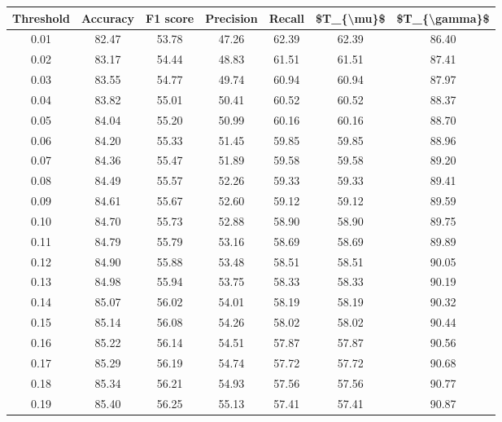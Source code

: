 \begin{tabular}{|c|c|c|c|c|c|c|}
\hline
 Threshold &  Accuracy &  F1 score &  Precision &  Recall &  \$T\_\{\textbackslash mu\}\$ &  \$T\_\{\textbackslash gamma\}\$ \\
\hline
      0.01 &     82.47 &     53.78 &      47.26 &   62.39 &      62.39 &         86.40 \\
      0.02 &     83.17 &     54.44 &      48.83 &   61.51 &      61.51 &         87.41 \\
      0.03 &     83.55 &     54.77 &      49.74 &   60.94 &      60.94 &         87.97 \\
      0.04 &     83.82 &     55.01 &      50.41 &   60.52 &      60.52 &         88.37 \\
      0.05 &     84.04 &     55.20 &      50.99 &   60.16 &      60.16 &         88.70 \\
      0.06 &     84.20 &     55.33 &      51.45 &   59.85 &      59.85 &         88.96 \\
      0.07 &     84.36 &     55.47 &      51.89 &   59.58 &      59.58 &         89.20 \\
      0.08 &     84.49 &     55.57 &      52.26 &   59.33 &      59.33 &         89.41 \\
      0.09 &     84.61 &     55.67 &      52.60 &   59.12 &      59.12 &         89.59 \\
      0.10 &     84.70 &     55.73 &      52.88 &   58.90 &      58.90 &         89.75 \\
      0.11 &     84.79 &     55.79 &      53.16 &   58.69 &      58.69 &         89.89 \\
      0.12 &     84.90 &     55.88 &      53.48 &   58.51 &      58.51 &         90.05 \\
      0.13 &     84.98 &     55.94 &      53.75 &   58.33 &      58.33 &         90.19 \\
      0.14 &     85.07 &     56.02 &      54.01 &   58.19 &      58.19 &         90.32 \\
      0.15 &     85.14 &     56.08 &      54.26 &   58.02 &      58.02 &         90.44 \\
      0.16 &     85.22 &     56.14 &      54.51 &   57.87 &      57.87 &         90.56 \\
      0.17 &     85.29 &     56.19 &      54.74 &   57.72 &      57.72 &         90.68 \\
      0.18 &     85.34 &     56.21 &      54.93 &   57.56 &      57.56 &         90.77 \\
      0.19 &     85.40 &     56.25 &      55.13 &   57.41 &      57.41 &         90.87 \\

\end{tabular}
